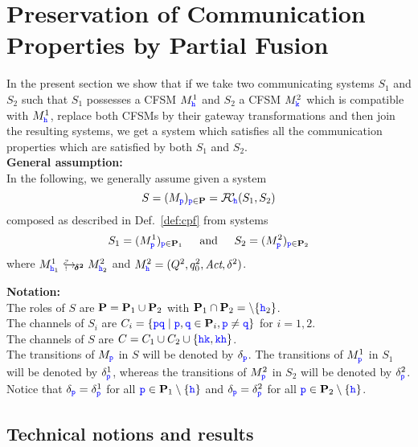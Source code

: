 


\section{Preservation of Communication Properties by Partial Fusion}
\label{sect:safetypreservation}


In the present section we show that if we take two communicating systems
$S_1$ and $S_2$ such that $S_1$ possesses a CFSM $M^1_\HH$ and $S_2$ a CFSM $M^2_\KK$ which is compatible with $M^1_\HH$, replace both CFSMs by their gateway transformations and then join the resulting systems, we get a system which satisfies all the communication properties which are satisfied by both $S_1$ and $S_2$.\\


\noindent
\textbf{General assumption:}\\ 
In the following, we generally assume given a
system  
$$S= (M_\ttp)_{\ttp\in\roles} = \fusioncomp_{\!\hh}(S_1,S_2)$$  
composed
as described in Def.~\ref{def:cpf}
from systems 
$$S_1= (M^1_\ttp)_{\ttp\in\roles_1}  \hspace{4mm} \text{ and } \hspace{4mm} S_2= (M^2_\ttp)_{\ttp\in\roles_2}$$ where $\emb{\bm{\delta^2}}{M^1_{\hh_1}}{M^2_{\hh_2}}$
and $M^2_\hh = (Q^2, q^2_0, \textit{Act}, \delta^2)$.



\vspace{2mm}
\noindent
\textbf{Notation:} \\
The roles of $S$ are $\roles=\roles_1\cup\roles_2$ with  $\roles_1\cap\roles_2=\setminus\Set{\hh_2}$.\\
The channels of $S_i$ are  $C_i=\Set{\ttp\ttq \mid \ttp,\ttq\in \roles_i, \ttp\neq\ttq}$ for $i=1,2$.\\
The channels of $S$ are 
$C=C_1\cup C_2\cup\Set{\HH\KK,\KK\HH}$.\\
The transitions of $M_\ttp$ in $S$ will be denoted by $\delta_\ttp$.
The transitions of $M^1_\ttp$ in $S_1$ will be denoted by $\delta^1_\ttp$, whereas the 
transitions of $M^2_\ttp$ in $S_2$ will be denoted by $\delta^2_\ttp$.
Notice that $\delta_\ttp = \delta^1_\ttp$ for all $\ttp\in\roles_1\setminus\Set{\HH}$
and $\delta_\ttp = \delta^2_\ttp$ for all $\ttp\in\roles_2\setminus\Set{\hh}$.



\subsection{Technical notions and results}

